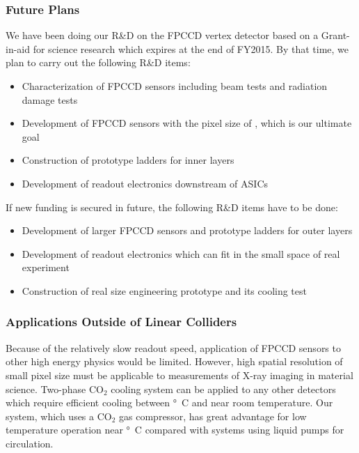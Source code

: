 \subsubsection{Future Plans}
    We have been doing our R\&D on the FPCCD vertex detector based on a Grant-in-aid for science research which expires at the end of FY2015. By that time, we plan to carry out the following R\&D items:
\begin{itemize}
    \item Characterization of FPCCD sensors including beam tests and radiation damage tests
    \item Development of FPCCD sensors with the pixel size of \unit[5]{\micron}, which is our ultimate goal
    \item Construction of prototype ladders for inner layers
    \item Development of readout electronics downstream of ASICs
\end{itemize}
If new funding is secured in future, the following R\&D items have to be done:
\begin{itemize}
    \item Development of larger FPCCD sensors and prototype ladders for outer layers
    \item Development of readout electronics which can fit in the small space of real experiment
    \item Construction of real size engineering prototype and its cooling test
\end{itemize}

\subsubsection{Applications Outside of Linear Colliders}
    Because of the relatively slow readout speed, application of FPCCD sensors to other high energy physics would be limited. However, high spatial resolution of small pixel size must be applicable to measurements of X-ray imaging in material science. 
    Two-phase $\text{CO}_2$ cooling system can be applied to any other detectors which require efficient cooling between \unit[-40]{\degree C} and near room temperature. Our system, which uses a $\text{CO}_2$ gas compressor, has great advantage for low temperature operation near \unit[-40]{\degree C} compared with systems using liquid pumps for circulation.


